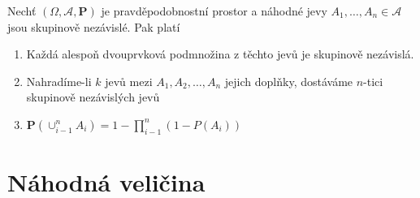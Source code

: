 \begin{theorem}
Nechť $( \Omega, \mathcal{A}, \textbf{P})$ je pravděpodobnostní prostor a náhodné jevy $A_1,\ldots,A_n \in \mathcal{A}$ jsou skupinově nezávislé. Pak platí
\begin{enumerate}
\item Každá alespoň dvouprvková podmnožina z těchto jevů je skupinově nezávislá.
\item Nahradíme-li $k$ jevů mezi $A_1,A_2,\ldots,A_n$ jejich doplňky, dostáváme $n$-tici skupinově nezávislých jevů
\item $\textbf{P}(\cup_{i-1}^{n} A_i)=1-\prod_{i-1}^{n}(1-P(A_i))$ 
\end{enumerate}
\end{theorem}


\section{Náhodná veličina}
